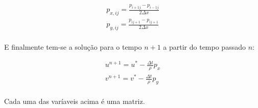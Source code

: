 \documentclass[a4paper,11pt]{article}
\begin{document}
\begin{eqnarray}
p_{x,ij}=\frac{p_{i+1j}-p_{i-1j}}{2\Delta x}\\
p_{y,ij}=\frac{p_{ij+1}-p_{ij+1}}{2\Delta x}
\end{eqnarray}

\paragraph{} E finalmente tem-se a solução para o tempo $n+1$ a partir do tempo passado $n$:

\begin{eqnarray}
u^{n+1}=u^*-\frac{\Delta t}{\rho}p_x\\
v^{n+1}=v^*-\frac{\Delta t}{\rho}p_y
\end{eqnarray}
\paragraph{} Cada uma das varíaveis acima é uma matriz.
\end{document}
